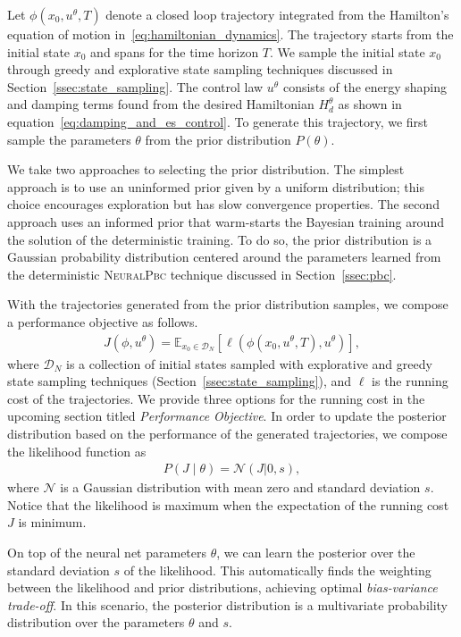 Let $\phi(x_0, u^\theta, T)$ denote a closed loop trajectory integrated from the
Hamilton's equation of motion in~\eqref{eq:hamiltonian_dynamics}. The trajectory
starts from the initial state $x_0$ and spans for the time horizon $T$.
%
We sample the initial state $x_0$ through greedy and explorative state sampling
techniques discussed in Section~\ref{ssec:state_sampling}. The control law
$u^\theta$ consists of the energy shaping and damping terms found from the
desired Hamiltonian $H^\theta_d$ as shown in
equation~\eqref{eq:damping_and_es_control}.
%
To generate this trajectory, we first sample the parameters $\theta$ from the
prior distribution $P(\theta)$.
%

We take two approaches to selecting the prior distribution. The simplest
approach is to use an uninformed prior given by a uniform distribution; this
choice encourages exploration but has slow convergence properties. The second
approach uses an informed prior that warm-starts the Bayesian training around
the solution of the deterministic training. To do so, the prior distribution is
a Gaussian probability distribution centered around the parameters learned from
the deterministic \textsc{NeuralPbc} technique discussed in
Section~\ref{ssec:pbc}.

With the trajectories generated from the prior distribution samples, we compose
a performance objective as follows.
\begin{align*}
    J(\phi, u^\theta) = \mathbb{E}_{x_0 \in \mathcal{D}_N} [ \ell( \phi(x_0, u^\theta, T), u^\theta) ], 
\end{align*}
\noindent where $\mathcal{D}_N$ is a collection of initial states sampled with
explorative and greedy state sampling techniques
(Section~\ref{ssec:state_sampling}), and $\ell$ is the running cost of the
trajectories. We provide three options for the running cost in the upcoming
section titled \textit{Performance Objective}.
%
In order to update the posterior distribution based on the performance of the
generated trajectories, we compose the likelihood function as
\begin{align}
    P(J \mid \theta) = \mathcal{N}\left(J | 0, s \right), 
    \label{eqn:likelihood_neuralpbc}
\end{align}
\noindent where $\mathcal{N}$ is a Gaussian distribution with mean zero and
standard deviation $s$.
%
Notice that the likelihood is maximum when the expectation of the running cost
$J$ is minimum.
%
\begin{rem}
    On top of the neural net parameters $\theta$, we can learn the posterior
    over the standard deviation $s$ of the likelihood. This automatically finds
    the weighting between the likelihood and prior distributions, achieving
    optimal \textit{bias-variance trade-off}. In this scenario, the posterior
    distribution is a multivariate probability distribution over the parameters
    $\theta$ and $s$. 
\end{rem}

